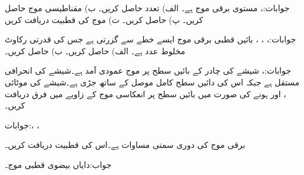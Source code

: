 جوابات:، 
مستوی برقی موج  ہے۔ الف) تعدد حاصل کریں۔ ب) مقناطیسی موج حاصل کریں۔ پ)  حاصل کریں۔ ت) موج کی قطبیت دریافت کریں

جوابات:، ، ، بائیں قطبی
برقی موج  ایسے خطے سے گزرتی ہے جس کی قدرتی رکاوٹ  مخلوط عدد ہے۔ الف)  حاصل کریں۔ ب)  حاصل کریں۔

جوابات:،
شیشے کی چادر کے بائیں سطح پر موج عمودی آمد ہے۔شیشے کی انحرافی مستقل  ہے جبکہ اس کی دائیں سطح کامل موصل کے ساتھ جڑی ہے۔شیشے کی موٹائی ،  اور  ہونے کی صورت میں بائیں سطح پر انعکاسی موج کے زاویے میں فرق دریافت کریں۔

جوابات:، ، 

برقی موج کی دوری سمتی مساوات  ہے۔اس کی قطبیت دریافت کریں۔

جواب:دایاں بیضوی قطبی موج۔
